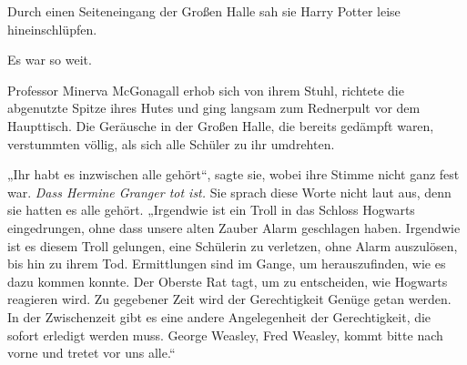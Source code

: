 Durch einen Seiteneingang der Großen Halle sah sie Harry Potter leise hineinschlüpfen.

Es war so weit.


Professor Minerva McGonagall erhob sich von ihrem Stuhl, richtete die abgenutzte Spitze ihres Hutes und ging langsam zum Rednerpult vor dem Haupttisch. Die Geräusche in der Großen Halle, die bereits gedämpft waren, verstummten völlig, als sich alle Schüler zu ihr umdrehten.

„Ihr habt es inzwischen alle gehört“, sagte sie, wobei ihre Stimme nicht ganz fest war. \emph{Dass Hermine Granger tot ist.} Sie sprach diese Worte nicht laut aus, denn sie hatten es alle gehört.
„Irgendwie ist ein Troll in das Schloss Hogwarts eingedrungen, ohne dass unsere alten Zauber Alarm geschlagen haben. Irgendwie ist es diesem Troll gelungen, eine Schülerin zu verletzen, ohne Alarm auszulösen, bis hin zu ihrem Tod. Ermittlungen sind im Gange, um herauszufinden, wie es dazu kommen konnte. Der Oberste Rat tagt, um zu entscheiden, wie Hogwarts reagieren wird. Zu gegebener Zeit wird der Gerechtigkeit Genüge getan werden. In der Zwischenzeit gibt es eine andere Angelegenheit der Gerechtigkeit, die sofort erledigt werden muss. George Weasley, Fred Weasley, kommt bitte nach vorne und tretet vor uns alle.“


